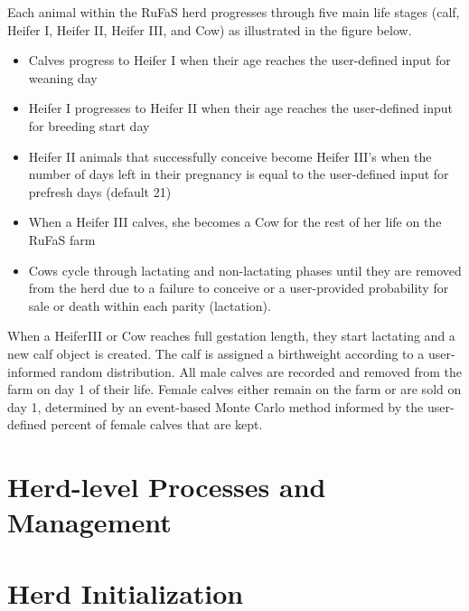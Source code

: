 \documentclass[
  letterpaper,
  oneside,
  openany]{scrbook}
\providecommand{\tightlist}{%
  \setlength{\itemsep}{0pt}\setlength{\parskip}{0pt}}
\begin{document}
Each animal within the RuFaS herd progresses through five main life
stages (calf, Heifer I, Heifer II, Heifer III, and Cow) as illustrated
in the figure below.

\begin{itemize}
\tightlist
\item
  Calves progress to Heifer I when their age reaches the user-defined
  input for weaning day
\item
  Heifer I progresses to Heifer II when their age reaches the
  user-defined input for breeding start day
\item
  Heifer II animals that successfully conceive become Heifer III's when
  the number of days left in their pregnancy is equal to the
  user-defined input for prefresh days (default 21)
\item
  When a Heifer III calves, she becomes a Cow for the rest of her life
  on the RuFaS farm
\item
  Cows cycle through lactating and non-lactating phases until they are
  removed from the herd due to a failure to conceive or a user-provided
  probability for sale or death within each parity (lactation).
\end{itemize}

When a HeiferIII or Cow reaches full gestation length, they start
lactating and a new calf object is created. The calf is assigned a
birthweight according to a user-informed random distribution. All male
calves are recorded and removed from the farm on day 1 of their life.
Female calves either remain on the farm or are sold on day 1, determined
by an event-based Monte Carlo method informed by the user-defined
percent of female calves that are kept.

\section{Herd-level Processes and
Management}\label{herd-level-processes-and-management}

\section{Herd Initialization}\label{herd-initialization}
\end{document}
